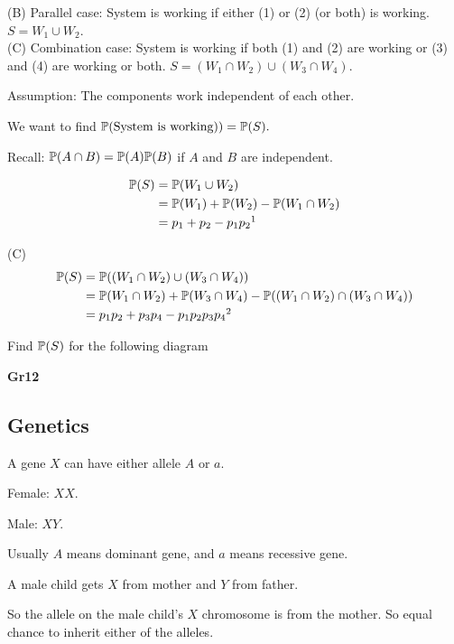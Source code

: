 \documentclass[10pt, a4paper]{article}
\begin{document}
(B) Parallel case:
System is working if either (1) or (2) (or both) is working.
$S = W_1 \cup W_2$. \\

(C) Combination case:
System is working if both (1) and (2) are working or (3) and (4) are working or both.
$S = (W_1 \cap W_2) \cup (W_3 \cap W_4)$.

Assumption: The components work independent of each other.

We want to find
$\P(\text{System is working)}) = \P(S).$

Recall: $\P(A \cap B) = \P(A)\P(B)$ if $A$ and $B$ are independent.

\begin{align*}
    \P(S) &= \P(W_1 \cup W_2) \\
    &= \P(W_1) + \P(W_2) - \P(W_1 \cap W_2) \\
    &= p_1 + p_2 - p_1p_2\footnotemark
\end{align*}

(C)
\begin{align*}
    \P(S) &= \P((W_1 \cap W_2) \cup (W_3 \cap W_4)) \\
    &= \P(W_1 \cap W_2) + \P(W_3 \cap W_4) - \P((W_1 \cap W_2) \cap (W_3 \cap W_4)) \\
    &= p_1p_2 + p_3p_4 - p_1p_2p_3p_4\footnotemark
\end{align*}

\begin{example}
    Find $\P(S)$ for the following diagram
    
    \textbf{Gr12}
\end{example}


\subsection{Genetics}
\begin{example}
    A gene $X$ can have either allele $A$ or $a$.
\end{example}

Female: $XX$.

Male: $XY$.

Usually $A$ means dominant gene,
and $a$ means recessive gene.

A male child gets $X$ from mother and $Y$ from father.

So the allele on the male child's $X$ chromosome is from the mother.
So equal chance to inherit either of the alleles.
\end{document}
